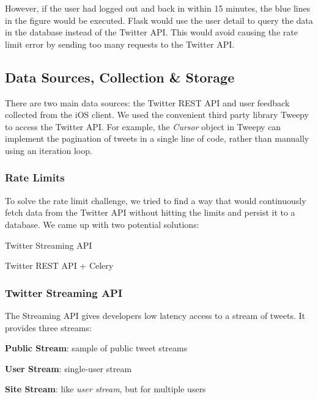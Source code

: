 \documentclass{article}
\begin{document}
However, if the user had logged out and back in within 15 minutes, the blue lines in the figure would be executed. Flask would use the user detail to query the data in the database instead of the Twitter API. This would avoid causing the rate limit error by sending too many requests to the Twitter API.


\subsection{Data Sources, Collection \& Storage} %
There are two main data sources: the Twitter REST API and user feedback collected from the iOS client. We used the convenient third party library Tweepy to access the Twitter API. For example, the \textit{Cursor} \cite{cursor} object in Tweepy can implement the pagination of tweets in a single line of code, rather than manually using an iteration loop.

\subsubsection*{Rate Limits} %
To solve the rate limit challenge, we tried to find a way that would continuously fetch data from the Twitter API without hitting the limits and persist it to a database. We came up with two potential solutions:

\begin{itemize*}
    \item Twitter Streaming API
    \item Twitter REST API + Celery
\end{itemize*}

\subsubsection*{Twitter Streaming API} %
The Streaming API gives developers low latency access to a stream of tweets. It provides three streams: 

\begin{itemize*}
    \item \textbf{Public Stream}: sample of public tweet streams
    \item \textbf{User Stream}: single-user stream
    \item \textbf{Site Stream}: like \textit{user stream}, but for multiple users
\end{itemize*}
\end{document}
